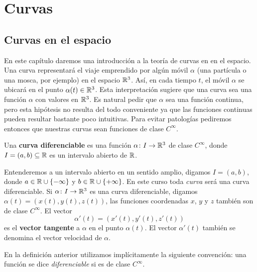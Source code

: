 \part{Curvas}

\chapter{Curvas en el espacio}

En este capítulo daremos una introducción a la teoría de curvas en en el
espacio. Una curva representará el viaje emprendido por algún móvil $\alpha$
(una partícula o una mosca, por ejemplo) en el espacio $\mathbb{R}^3$.  Así, en cada
tiempo $t$, el móvil $\alpha$ se ubicará en el punto $\alpha(t)\in\mathbb{R}^3$. Esta
interpretación sugiere que una curva sea una función $\alpha$ con valores en
$\mathbb{R}^3$. Es natural pedir que $\alpha$ sea una función continua, pero esta
hipótesis no resulta del todo conveniente ya que las funciones continuas pueden
resultar bastante poco intuitivas. Para evitar patologías pediremos entonces
que nuestras curvas sean funciones de clase $C^\infty$. 

\begin{definition}
	Una \textbf{curva diferenciable} es una función $\alpha\colon I\to\mathbb{R}^3$ de
	clase $C^{\infty}$, donde $I=(a,b)\subseteq\mathbb{R}$ es un intervalo abierto de
	$\mathbb{R}$.
\end{definition}

Entenderemos a un intervalo abierto en un sentido amplio, digamos $I=(a,b)$,
donde $a\in\mathbb{R}\cup\{-\infty\}$ y $b\in\mathbb{R}\cup\{+\infty\}$.    En este curso toda \emph{curva}
será una curva diferenciable. Si $\alpha\colon I\to\mathbb{R}^3$ es una curva
diferenciable, digamos $\alpha(t)=(x(t),y(t),z(t))$, las funciones coordenadas
$x$, $y$ y $z$ también son de clase $C^{\infty}$.  El vector
\[
	\alpha'(t)=(x'(t),y'(t),z'(t))
\]
es el \textbf{vector tangente} a $\alpha$ en el punto $\alpha(t)$. El vector
$\alpha'(t)$ también se denomina el vector velocidad de $\alpha$. 

En la definición anterior utilizamos implícitamente la siguiente convención: una función
se dice \emph{diferenciable} si es de clase $C^{\infty}$.

